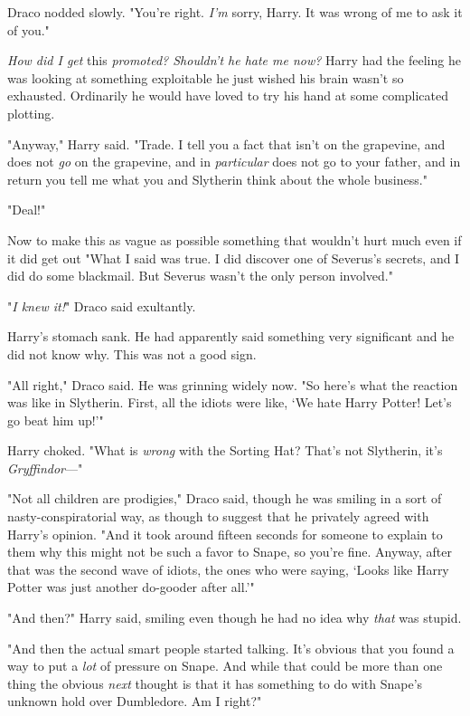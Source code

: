 Draco nodded slowly. "You're right. \emph{I'm} sorry, Harry. It was wrong of me
to ask it of you."

\emph{How did I get} this \emph{promoted? Shouldn't he hate me now?} Harry had
the feeling he was looking at something exploitable{\el} he just wished his
brain wasn't so exhausted. Ordinarily he would have loved to try his hand at
some complicated plotting.

"Anyway," Harry said. "Trade. I tell you a fact that isn't on the grapevine,
and does not \emph{go} on the grapevine, and in \emph{particular} does not go
to your father, and in return you tell me what you and Slytherin think about
the whole business."

"Deal!"

Now to make this as vague as possible{\el} something that wouldn't hurt much
even if it did get out{\el} "What I said was true. I did discover one of
Severus's secrets, and I did do some blackmail. But Severus wasn't the only
person involved."

"\emph{I knew it!}" Draco said exultantly.

Harry's stomach sank. He had apparently said something very significant and he
did not know why. This was not a good sign.

"All right," Draco said. He was grinning widely now. "So here's what the
reaction was like in Slytherin. First, all the idiots were like, `We hate Harry
Potter! Let's go beat him up!'"

Harry choked. "What is \emph{wrong} with the Sorting Hat? That's not Slytherin,
it's \emph{Gryffindor}---"

"Not all children are prodigies," Draco said, though he was smiling in a sort
of nasty-conspiratorial way, as though to suggest that he privately agreed with
Harry's opinion. "And it took around fifteen seconds for someone to explain to
them why this might not be such a favor to Snape, so you're fine. Anyway, after
that was the second wave of idiots, the ones who were saying, `Looks like Harry
Potter was just another do-gooder after all.'"

"And then?" Harry said, smiling even though he had no idea why \emph{that} was
stupid.

"And then the actual smart people started talking. It's obvious that you found
a way to put a \emph{lot} of pressure on Snape. And while that could be more
than one thing{\el} the obvious \emph{next} thought is that it has something
to do with Snape's unknown hold over Dumbledore. Am I right?"

